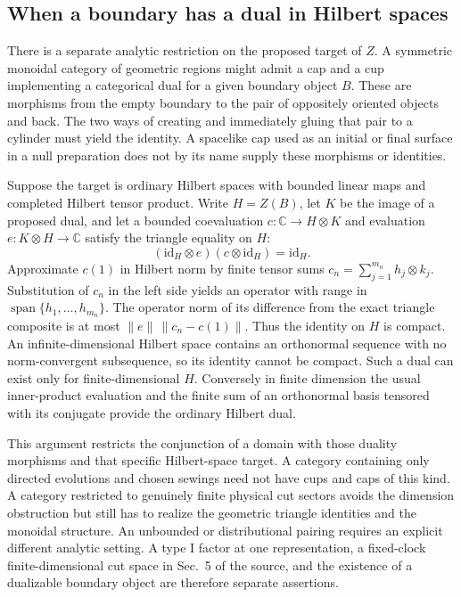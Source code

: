 \documentclass[11pt,letterpaper]{article}
\begin{document}
\subsection{When a boundary has a dual in Hilbert spaces}
There is a separate analytic restriction on the proposed target of
\(Z\). A symmetric monoidal category of geometric regions might admit
a cap and a cup implementing a categorical dual for a given boundary
object \(B\). These are morphisms from the empty boundary to the pair
of oppositely oriented objects and back. The two ways of creating and
immediately gluing that pair to a cylinder must yield the identity.
A spacelike cap used as an initial or final surface in a null
preparation does not by its name supply these morphisms or identities.

Suppose the target is ordinary Hilbert spaces with bounded linear maps
and completed Hilbert tensor product. Write \(H=Z(B)\), let \(K\)
be the image of a proposed dual, and let a bounded coevaluation
\(c:\mathbb C\to H\otimes K\) and evaluation
\(e:K\otimes H\to\mathbb C\) satisfy the triangle equality on \(H\):
\[
 (\mathrm{id}_H\otimes e)(c\otimes\mathrm{id}_H)=\mathrm{id}_H .
\]
Approximate \(c(1)\) in Hilbert norm by finite tensor sums
\(c_n=\sum_{j=1}^{m_n}h_j\otimes k_j\). Substitution of \(c_n\)
in the left side yields an operator with range in
\(\operatorname{span}\{h_1,\ldots,h_{m_n}\}\).
The operator norm of its difference from the exact triangle composite
is at most \(\|e\|\,\|c_n-c(1)\|\).
Thus the identity on \(H\) is compact. An infinite-dimensional Hilbert
space contains an orthonormal sequence with no norm-convergent
subsequence, so its identity cannot be compact. Such a dual can exist
only for finite-dimensional \(H\). Conversely in finite dimension the
usual inner-product evaluation and the finite sum of an orthonormal
basis tensored with its conjugate provide the ordinary Hilbert dual.

This argument restricts the conjunction of a domain with those duality
morphisms and that specific Hilbert-space target. A category containing
only directed evolutions and chosen sewings need not have cups and caps
of this kind. A category restricted to genuinely finite physical cut
sectors avoids the dimension obstruction but still has to realize the
geometric triangle identities and the monoidal structure. An unbounded
or distributional pairing requires an explicit different analytic
setting. A type I factor at one representation, a fixed-clock
finite-dimensional cut space in Sec.~5 of the source, and the existence
of a dualizable boundary object are therefore separate assertions.
\end{document}
